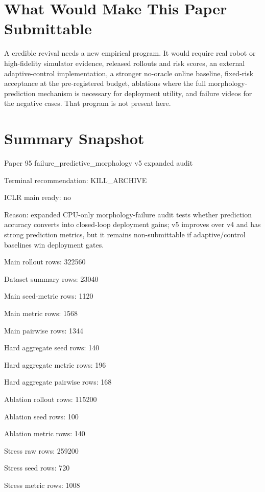 \documentclass{article}
\begin{document}
\section{What Would Make This Paper Submittable}
A credible revival needs a new empirical program. It would require real robot or high-fidelity simulator evidence, released rollouts and risk scores, an external adaptive-control implementation, a stronger no-oracle online baseline, fixed-risk acceptance at the pre-registered budget, ablations where the full morphology-prediction mechanism is necessary for deployment utility, and failure videos for the negative cases. That program is not present here.

\section{Summary Snapshot}
\begingroup\footnotesize
\noindent Paper 95 failure\_predictive\_morphology v5 expanded audit\par
\noindent Terminal recommendation: KILL\_ARCHIVE\par
\noindent ICLR main ready: no\par
\noindent Reason: expanded CPU-only morphology-failure audit tests whether prediction accuracy converts into closed-loop deployment gains; v5 improves over v4 and has strong prediction metrics, but it remains non-submittable if adaptive/control baselines win deployment gates.\par
\noindent Main rollout rows: 322560\par
\noindent Dataset summary rows: 23040\par
\noindent Main seed-metric rows: 1120\par
\noindent Main metric rows: 1568\par
\noindent Main pairwise rows: 1344\par
\noindent Hard aggregate seed rows: 140\par
\noindent Hard aggregate metric rows: 196\par
\noindent Hard aggregate pairwise rows: 168\par
\noindent Ablation rollout rows: 115200\par
\noindent Ablation seed rows: 100\par
\noindent Ablation metric rows: 140\par
\noindent Stress raw rows: 259200\par
\noindent Stress seed rows: 720\par
\noindent Stress metric rows: 1008\par
\end{document}
